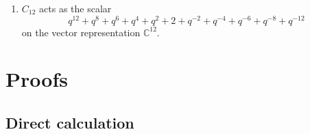 \documentclass{ximera}
\begin{document}
\begin{theorem}
\begin{enumerate}
\begin{center}
\begin{tabular}{lcc|lcc}
$(L_3, -L_6)$ & $q^{-5}$ & $K_{-L_3+L_6}$ & $(L_6, -L_3)$ & $q$ & $K_{-L_6+L_3}$ \\
$(L_3, -L_5)$ & $q^{-5}$ & $K_{-L_3+L_5}$ & $(L_5, -L_3)$ & $q^{-1}$ & $K_{-L_5+L_3}$ \\
$(L_3, -L_4)$ & $q^{-5}$ & $K_{-L_3+L_4}$ & $(L_4, -L_3)$ & $q^{-3}$ & $K_{-L_4+L_3}$ \\
$(L_3, -L_3)$ & $q^{-4}$ & $K_0 = 1$ & & & \\
\hline
$(L_4, L_5)$ & $q^{-3}$ & $K_{-L_4-L_5}$ & $(-L_5, -L_4)$ & $q^{3}$ & $K_{L_4+L_5}$ \\
$(L_4, L_6)$ & $q^{-3}$ & $K_{-L_4-L_6}$ & $(-L_6, -L_4)$ & $q$ & $K_{L_4+L_6}$ \\
$(L_4, -L_6)$ & $q^{-3}$ & $K_{-L_4+L_6}$ & $(L_6, -L_4)$ & $q$ & $K_{-L_6+L_4}$ \\
$(L_4, -L_5)$ & $q^{-3}$ & $K_{-L_4+L_5}$ & $(L_5, -L_4)$ & $q^{-1}$ & $K_{-L_5+L_4}$ \\
$(L_4, -L_4)$ & $q^{-2}$ & $K_0 = 1$ & & & \\
\hline
$(L_5, L_6)$ & $q^{-1}$ & $K_{-L_5-L_6}$ & $(-L_6, -L_5)$ & $q$ & $K_{L_5+L_6}$ \\
$(L_5, -L_6)$ & $q^{-1}$ & $K_{-L_5+L_6}$ & $(L_6, -L_5)$ & $q$ & $K_{-L_6+L_5}$ \\
$(L_5, -L_5)$ & $q^{0}$ & $K_0 = 1$ & & & \\
\hline
\end{tabular}
\end{center}
The dual elements $e^*_{\mu,\lambda}$ for these 44 pairs are: \footnotesize

\allowdisplaybreaks


\normalsize

\item $C_{12}$ acts as the scalar
\[
    q^{12} + q^{8} + q^{6} + q^{4} + q^{2} + 2 + q^{-2} + q^{-4} + q^{-6} + q^{-8} + q^{-12}
\]
on the vector representation $\mathbb{C}^{12}$.
\end{enumerate}
\end{theorem}

\section{Proofs}\label{sec:proofs}

\subsection{Direct calculation}
\end{document}
